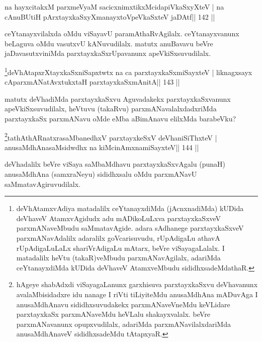 \begin{shl}
na hayxcitakxM parxmeVyaM sacicxnimxtikxMcidapiVkaSxyXteV |
na cAnuBUtiH pArxtayxkaSxyXmanayxtoV\s peVkaSxteV jaDAtf\hfill || 142 ||
\end{shl}

\begin{artha}
ceYtanayxvilalxda oMdu viSayavU paramAthaRvAgilalx. ceYtanayxvanunx  beLaguva oMdu vasutxvU kANuvudilalx. matutx anuBavavu beVre jaDavasutxviniMda parxtayxkaSxrUpavanunx apeVkiSxsuvudilalx.
\end{artha}

\begin{shl}
\footnote{deVhAtamxvAdiya matadalilx ceYtanayxdiMda 
(jAcnxnadiMda) kUDida deVhaveV AtamxvAgidudx adu mADikoLuLxva 
parxtayxkaSxveV parxmANaveMbudu saMmatavAgide. adara sAdhanege 
parxtayxkaSxveV parxmANavAdalilx adaralilx goVcarisuvudu, rUpAdigaLu 
athavA rUpAdigaLuLaLx shariVrAdigaLu mAtarx, beVre viSayagaLalalx. I matadalilx heVtu (takaR)veMbudu parxmANavAgilalx, adariMda ceYtanayxdiMda kUDida deVhaveV AtamxveMbudu sididhxsadeMdathaR.}deVhAtapxrXtayxkaSxniSapxtwtx na ca parxtayxkaSxmiSayxteV |
liknagxsayx cAparxmANatAvxtukxtaH  parxtayxkaSxmAnitA\hfill || 143 ||
\end{shl}

\begin{artha}
matutx deVhadiMda parxtayxkaSxvu Aguvadakekx parxtayxkaSxvanunx apeVkiSxsuvudilalx, heVtuvu (takaRvu) parxmANavalalxdadxriMda parxtayxkaSx parxmANavu oMde eMba aBimAnavu elilxMda barabeVku?
\end{artha}

\begin{shl}
\footnote{hAgeye shabAdxdi viSayagaLanunx garxhisuva 
parxtayxkaSxvu deVhavanunx avalaMbisidadxre idu nanage I riVti 
tiLiyiteMdu anusaMdhAna mADuvAga I anusaMdhAnavu sididhxsuvudakekx 
parxmANaveVneMdu keVLidare parxtayxkaSx parxmANaveMdu heVLalu shakayxvalalx. beVre parxmANavanunx opupxvudilalx, adariMda parxmANavilalxdariMda anusaMdhAnaveV sididhxsadeMdu tAtapxyaR.}tathA\s thARnatxrasaMbanedhxV parxtayxkeSxV deVhaniSiThxteV |
anusaMdhAnasaMsidwdhx na kiMcinAmxnamiSayxteV\hfill || 144 ||
\end{shl}

\begin{artha}
deVhadalilx beVre viSaya saMbaMdhavu parxtayxkaSxvAgalu (punaH) 
anusaMdhAna (samxraNeyu) sididhxsalu oMdu parxmANavU saMmatavAgiruvudilalx. 
\end{artha}


